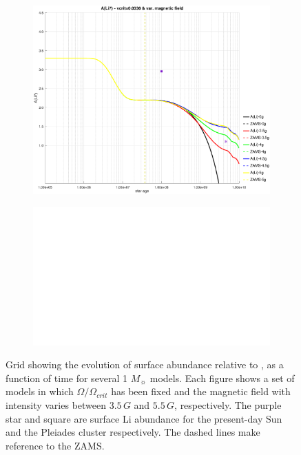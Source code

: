 \documentclass[fleqn,usenatbib]{mnras}
\begin{document}
\begin{figure}
\begin{subfigure}[h]{0.47\textwidth}
    \includegraphics[trim = 40mm 15mm 15mm 15mm, clip,width=\textwidth]{figures/li_vc_0336_var_g.eps}
    \label{fig:subim25}
    \end{subfigure}
    \begin{subfigure}[h]{0.47\textwidth}
    \includegraphics[width=\textwidth]{figures/blank.eps}
    \label{fig:subim26}
    \end{subfigure}
\caption{Grid showing the evolution of surface  abundance relative to , as a function of time for several 1 $M_{\sun}$ models. Each figure shows a set of models in which $\Omega / \Omega_{crit}$ has been fixed and the magnetic field with intensity varies between $3.5\,G$ and $5.5\,G$, respectively. The purple star and square are surface Li abundance for the present-day Sun \citep{Asplund2009} and the Pleiades cluster \citep{Sestito2005} respectively. The dashed lines make reference to the ZAMS.}
\label{fig:grid_li_var_g}
\end{figure}
\end{document}
